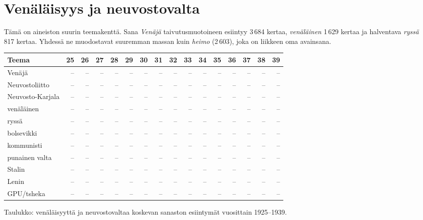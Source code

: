 \documentclass[10pt,a4paper]{article}
\begin{document}
\section{Venäläisyys ja neuvostovalta}

Tämä on aineiston suurin teemakenttä. Sana \emph{Venäjä} taivutusmuotoineen esiintyy
3\,684 kertaa, \emph{venäläinen} 1\,629 kertaa ja halventava \emph{ryssä} 817 kertaa.
Yhdessä ne muodostavat suuremman massan kuin \emph{heimo} (2\,603), joka on liikkeen
oma avainsana.


\begin{center}\small
\begin{tabular}{@{}lrrrrrrrrrrrrrrr@{}}
\toprule
\textbf{Teema} & \textbf{25} & \textbf{26} & \textbf{27} & \textbf{28} & \textbf{29} & \textbf{30} & \textbf{31} & \textbf{32} & \textbf{33} & \textbf{34} & \textbf{35} & \textbf{36} & \textbf{37} & \textbf{38} & \textbf{39}\\
\midrule
Venäjä & -- & -- & -- & -- & -- & -- & -- & -- & -- & -- & -- & -- & -- & -- & --\\
Neuvostoliitto & -- & -- & -- & -- & -- & -- & -- & -- & -- & -- & -- & -- & -- & -- & --\\
Neuvosto-Karjala & -- & -- & -- & -- & -- & -- & -- & -- & -- & -- & -- & -- & -- & -- & --\\
venäläinen & -- & -- & -- & -- & -- & -- & -- & -- & -- & -- & -- & -- & -- & -- & --\\
ryssä & -- & -- & -- & -- & -- & -- & -- & -- & -- & -- & -- & -- & -- & -- & --\\
bolsevikki & -- & -- & -- & -- & -- & -- & -- & -- & -- & -- & -- & -- & -- & -- & --\\
kommunisti & -- & -- & -- & -- & -- & -- & -- & -- & -- & -- & -- & -- & -- & -- & --\\
punainen valta & -- & -- & -- & -- & -- & -- & -- & -- & -- & -- & -- & -- & -- & -- & --\\
Stalin & -- & -- & -- & -- & -- & -- & -- & -- & -- & -- & -- & -- & -- & -- & --\\
Lenin & -- & -- & -- & -- & -- & -- & -- & -- & -- & -- & -- & -- & -- & -- & --\\
GPU/tsheka & -- & -- & -- & -- & -- & -- & -- & -- & -- & -- & -- & -- & -- & -- & --\\
\bottomrule
\end{tabular}
\end{center}
{\footnotesize Taulukko: venäläisyyttä ja neuvostovaltaa koskevan sanaston esiintymät vuosittain 1925--1939.}
\end{document}
